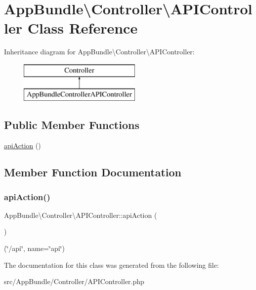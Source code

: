 \hypertarget{class_app_bundle_1_1_controller_1_1_a_p_i_controller}{}\section{App\+Bundle\textbackslash{}Controller\textbackslash{}A\+P\+I\+Controller Class Reference}
\label{class_app_bundle_1_1_controller_1_1_a_p_i_controller}
Inheritance diagram for App\+Bundle\textbackslash{}Controller\textbackslash{}A\+P\+I\+Controller\+:\begin{figure}[H]
\begin{center}
\leavevmode
\includegraphics[height=2.000000cm]{class_app_bundle_1_1_controller_1_1_a_p_i_controller}
\end{center}
\end{figure}
\subsection*{Public Member Functions}
\begin{DoxyCompactItemize}
\item 
\mbox{\hyperlink{class_app_bundle_1_1_controller_1_1_a_p_i_controller_a61d1e2704677b4f2b6c469e0ee45c28a}{api\+Action}} ()
\end{DoxyCompactItemize}


\subsection{Member Function Documentation}
\mbox{\label{class_app_bundle_1_1_controller_1_1_a_p_i_controller_a61d1e2704677b4f2b6c469e0ee45c28a}} 
\subsubsection{\texorpdfstring{api\+Action()}{apiAction()}}
{\footnotesize\ttfamily App\+Bundle\textbackslash{}\+Controller\textbackslash{}\+A\+P\+I\+Controller\+::api\+Action (\begin{DoxyParamCaption}{ }\end{DoxyParamCaption})}

(\char`\"{}/api\char`\"{}, name=\char`\"{}api\char`\"{}) 

The documentation for this class was generated from the following file\+:\begin{DoxyCompactItemize}
\item 
src/\+App\+Bundle/\+Controller/A\+P\+I\+Controller.\+php\end{DoxyCompactItemize}
